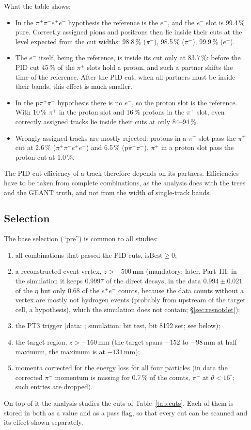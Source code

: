 \documentclass[11pt,a4paper]{article}
\newcommand{\pip}{\ensuremath{\pi^{+}}\xspace}
\newcommand{\pim}{\ensuremath{\pi^{-}}\xspace}
\newcommand{\ee}{\ensuremath{e^{+}e^{-}}\xspace}
\newcommand{\ppee}{\ensuremath{\pi^{+}\pi^{-}e^{+}e^{-}}\xspace}
\newcommand{\code}[1]{\texttt{\detokenize{#1}}}
\begin{document}
What the table shows:
\begin{itemize}
\item In the \ppee hypothesis the reference is the $e^-$, and the $e^-$ slot is 99.4\,\%
      pure. Correctly assigned pions and positrons then lie inside their cuts at the level
      expected from the cut widths: 98.8\,\% (\pip), 98.5\,\% (\pim), 99.9\,\% ($e^+$).
\item The $e^-$ itself, being the reference, is inside its cut only at 83.7\,\%: before the PID
      cut 45\,\% of the \pip slots hold a proton, and such a partner shifts the time of the
      reference. After the PID cut, when all partners must be inside their bands, this effect is
      much smaller.
\item In the p\pip\pim hypothesis there is no $e^-$, so the proton slot is the reference. With
      10\,\% \pip in the proton slot and 16\,\% protons in the \pip slot, even correctly assigned
      tracks lie inside their cuts at only 84--94\,\%.
\item Wrongly assigned tracks are mostly rejected: protons in a \pip slot pass the \pip cut at
      2.6\,\% (\ppee) and 6.5\,\% (p\pip\pim), \pip in a proton slot pass the proton cut at
      1.0\,\%.
\end{itemize}
The PID cut efficiency of a track therefore depends on its partners. Efficiencies have to be
taken from complete combinations, as the analysis does with the \code{_ID} trees and the GEANT
truth, and not from the width of single-track bands.

\subsection{Selection}
\label{sec:sel}
The base selection (``pre'') is common to all studies:
\begin{enumerate}
\item all combinations that passed the PID cuts, $\mathrm{isBest}\ge0$;
\item a reconstructed event vertex, $z>-500$\,mm (mandatory; later, Part~III: in the simulation it keeps 0.9997 of the
      direct decays, in the data $0.994\pm0.021$ of the $\eta$ but only 0.68 of the \ee counts, because the data counts without a
      vertex are mostly not hydrogen events (probably from upstream of the target cell, a hypothesis), which the simulation does not contain; \S\ref{sec:resnotdet});
\item the PT3 trigger (data: \code{trigbit == 8192}; simulation: bit test, bit 8192 set; see below);
\item the target region, $z>-160$\,mm (the target spans $-152$ to $-98$\,mm at half
      maximum, the maximum is at $-131$\,mm);
\item momenta corrected for the energy loss for all four particles (in data the corrected
      \pim momentum is missing for 0.7\,\% of the counts, \pim at $\theta<16^\circ$; such entries are
      dropped).
\end{enumerate}
On top of it the analysis studies the cuts of Table~\ref{tab:cuts}. Each of them is stored in
\code{scan_nt} both as a value and as a pass flag, so that every cut can be scanned and its
effect shown separately.
\end{document}
